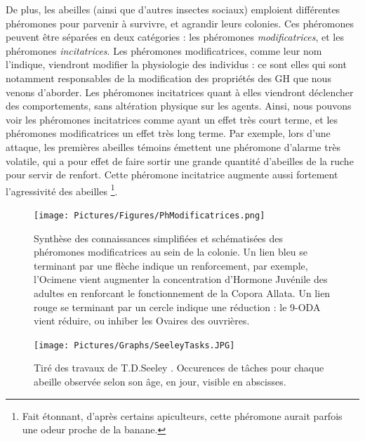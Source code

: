 			De plus, les abeilles (ainsi que d'autres insectes sociaux) emploient différentes phéromones pour parvenir à survivre, et agrandir leurs colonies. Ces phéromones peuvent être séparées en deux catégories : les phéromones \textit{modificatrices}, et les phéromones \textit{incitatrices}. Les phéromones modificatrices, comme leur nom l'indique, viendront modifier la physiologie des individus : ce sont elles qui sont notamment responsables de la modification des propriétés des GH que nous venons d'aborder. Les phéromones incitatrices quant à elles viendront déclencher des comportements, sans altération physique sur les agents. Ainsi, nous pouvons voir les phéromones incitatrices comme ayant un effet très court terme, et les phéromones modificatrices un effet très long terme. Par exemple, lors d'une attaque, les premières abeilles témoins émettent une phéromone d'alarme très volatile, qui a pour effet de faire sortir une grande quantité d'abeilles de la ruche pour servir de renfort. Cette phéromone incitatrice augmente aussi fortement l'agressivité des abeilles \footnote{Fait étonnant, d'après certains apiculteurs, cette phéromone aurait parfois une odeur proche de la banane.}.
			
			
			
			
			\begin{figure}
			\centering
				\texttt{[image: Pictures/Figures/PhModificatrices.png]}
				\caption{Synthèse des connaissances simplifiées et schématisées des phéromones modificatrices au sein de la colonie. Un lien bleu se terminant par une flèche indique un renforcement, par exemple, l'Ocimene vient augmenter la concentration d'Hormone Juvénile des adultes en renforcant le fonctionnement de la Copora Allata. Un lien rouge se terminant par un cercle indique une réduction : le 9-ODA vient réduire, ou inhiber les Ovaires des ouvrières.}
				\label{phMod}
			\end{figure}	
			
			\begin{figure}
			\centering
				\texttt{[image: Pictures/Graphs/SeeleyTasks.JPG]}
				\caption{Tiré des travaux de T.D.Seeley \cite{seeley_wisdom_1995}. Occurences de tâches pour chaque abeille observée selon son âge, en jour, visible en abscisses.}
				\label{SeeleyTasks}
			\end{figure}	
			
